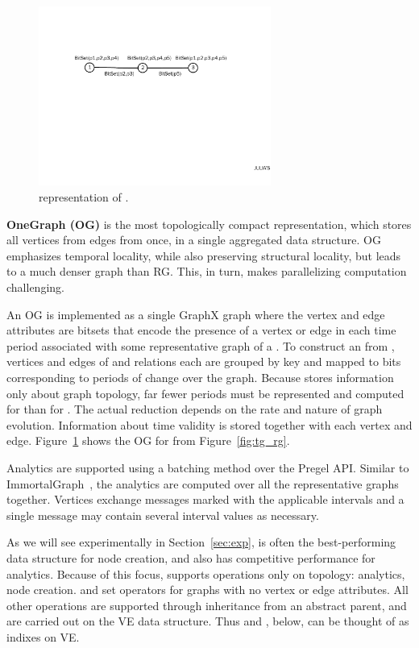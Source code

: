 \begin{figure}[t!]
\centering
\includegraphics[width=3in]{figs/ogc.pdf}
\vspace{-0.2cm}
\caption{\og representation of .}
\vspace{-0.1cm}
\label{fig:ogc}
\end{figure}

{\bf OneGraph (OG)} is the most topologically compact representation,
which stores all vertices from  edges from \tae once, in
a single aggregated data structure.  OG emphasizes temporal locality,
while also preserving structural locality, but leads to a much denser
graph than RG.  This, in turn, makes parallelizing computation
challenging.

An OG is implemented as a single GraphX graph where the vertex and
edge attributes are bitsets that encode the presence of a vertex or
edge in each time period associated with some representative graph of
a \tg.  To construct an \og from \tve, vertices and edges of \tv and
\te relations each are grouped by key and mapped to bits corresponding
to periods of change over the graph.  Because \og stores information
only about graph topology, far fewer periods must be represented and
computed for \og than for \rg.  The actual reduction depends on the
rate and nature of graph evolution.  Information about time validity
is stored together with each vertex and edge.  Figure~\ref{fig:ogc}
shows the OG for  from Figure~\ref{fig:tg_rg}.

Analytics are supported using a batching method over the Pregel API.
Similar to ImmortalGraph~\cite{Miao2015}, the analytics are computed
over all the representative graphs together.  Vertices exchange
messages marked with the applicable intervals and a single message may
contain several interval values as necessary.

As we will see experimentally in Section~\ref{sec:exp}, \og is often
the best-performing data structure for node creation, and also has
competitive performance for analytics.  Because of this focus, \og
supports operations only on topology: analytics, node creation. and
set operators for graphs with no vertex or edge attributes.  All other
operations are supported through inheritance from an abstract parent,
and are carried out on the VE data structure.  Thus \og and \hg,
below, can be thought of as indixes on VE.

